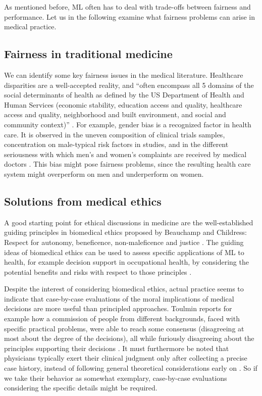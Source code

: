     As mentioned before, ML often has to deal with trade-offs between fairness and performance.
    Let us in the following examine what fairness problems can arise in medical practice.

\subsection{Fairness in traditional medicine}
    We can identify some key fairness issues in the medical literature.
    Healthcare disparities are a well-accepted reality, and ``often encompass all 5 domains of the social determinants of health as defined by the US Department of Health and Human Services (economic stability, education access and quality, healthcare access and quality, neighborhood and built environment, and social and community context)'' \cite[p.~2]{Chen2021}.
    For example, gender bias is a recognized factor in health care.
    It is observed \eg in the uneven composition of clinical trials samples, concentration on male-typical risk factors in studies, and in the different seriousness with which men's and women's complaints are received by medical doctors \cite{Ruiz1997}.
    This bias might pose fairness problems, since the resulting health care system might overperform on men and underperform on women.

\subsection{Solutions from medical ethics}
    A good starting point for ethical discussions in medicine are the well-established guiding principles in biomedical ethics proposed by Beauchamp and Childress: Respect for autonomy, beneficence, non-maleficence and justice \cite{Dijkstra2020, Morley2020, Rajkomar2018}.
    The guiding ideas of biomedical ethics can be used to assess specific applications of ML to health, for example decision support in occupational health, by considering the potential benefits and risks with respect to those principles \cite{Dijkstra2020}.

    Despite the interest of considering biomedical ethics, actual practice seems to indicate that case-by-case evaluations of the moral implications of medical decisions are more useful than principled approaches.
    Toulmin\cite{Toulmin1982} reports for example how a commission of people from different backgrounds, faced with specific practical problems, were able to reach some consensus (disagreeing at most about the degree of the decisions), all while furiously disagreeing about the principles supporting their decisions \cite{Toulmin1982}.
    It must furthermore be noted that physicians typically exert their clinical judgment only after collecting a precise case history, instead of following general theoretical considerations early on \cite{Toulmin1982}.
    So if we take their behavior as somewhat exemplary, case-by-case evaluations considering the specific details might be required.
